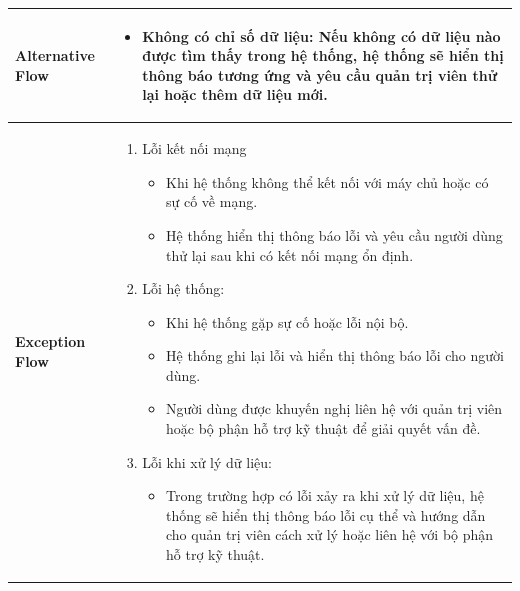 \begin{longtable}[H]{|l|p{}|}
        \hline
        
        \textbf{Alternative Flow} & \vspace{-0.75cm} \begin{itemize}[leftmargin=4mm]
            \item Không có chỉ số dữ liệu: Nếu không có dữ liệu nào được tìm thấy trong hệ thống, hệ thống sẽ hiển thị thông báo tương ứng và yêu cầu quản trị viên thử lại hoặc thêm dữ liệu mới.
        \end{itemize} \\
        
        \hline
        
        \textbf{Exception Flow} & \vspace{-0.75cm} \begin{enumerate}[leftmargin=5.5mm]
            \setlength\itemsep{0em}
            \item Lỗi kết nối mạng
                \begin{itemize}
                    \setlength\itemsep{0em}
                    \item Khi hệ thống không thể kết nối với máy chủ hoặc có sự cố về mạng.
                    \item Hệ thống hiển thị thông báo lỗi và yêu cầu người dùng thử lại sau khi có kết nối mạng ổn định.
                \end{itemize}
            \item Lỗi hệ thống:
                \begin{itemize}
                    \setlength\itemsep{0em}
                    \item Khi hệ thống gặp sự cố hoặc lỗi nội bộ.
                    \item Hệ thống ghi lại lỗi và hiển thị thông báo lỗi cho người dùng.
                    \item Người dùng được khuyến nghị liên hệ với quản trị viên hoặc bộ phận hỗ trợ kỹ thuật để giải quyết vấn đề.
                \end{itemize}
            \item Lỗi khi xử lý dữ liệu: 
                \begin{itemize}
                    \setlength\itemsep{0em}
                    \item Trong trường hợp có lỗi xảy ra khi xử lý dữ liệu, hệ thống sẽ hiển thị thông báo lỗi cụ thể và hướng dẫn cho quản trị viên cách xử lý hoặc liên hệ với bộ phận hỗ trợ kỹ thuật.
                \end{itemize}
        \end{enumerate}\\
        \hline 
    \end{longtable}

